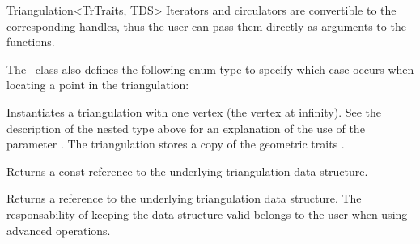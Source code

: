 \begin{ccRefClass}{Triangulation<TrTraits, TDS>}
Iterators and circulators are convertible to the corresponding handles, thus
the user can pass them directly as arguments to the functions.

\ccGlue{}

\ccGlue{}

\ccGlue{}

The \ccRefName\ class also defines the following enum type to specify
which case occurs when locating a point in the triangulation:


\ccCreation
{}

{Instantiates a triangulation with one vertex (the vertex at infinity). See the
description of the nested type  above for an
explanation of the use of the parameter . The triangulation stores a copy
of the geometric traits .}


%
{Returns a const reference to the underlying triangulation data structure.}

\begin{ccAdvanced}
%
{Returns a %
reference to the underlying triangulation data structure.
The responsability of keeping the data structure valid belongs to the
user when using advanced operations.}
\end{ccAdvanced}


\end{ccRefClass}
